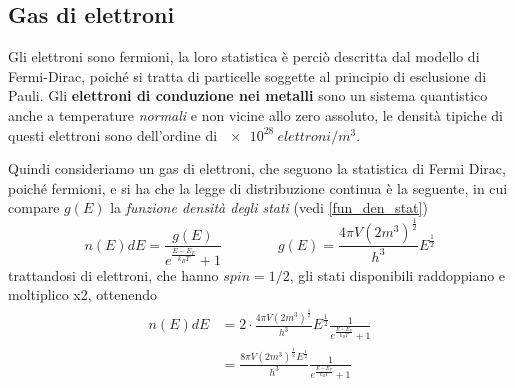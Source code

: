 \subsection{Gas di elettroni}

Gli elettroni sono fermioni, la loro statistica è perciò descritta dal modello di Fermi-Dirac, poiché si tratta di particelle soggette al principio di esclusione di Pauli.
Gli \textbf{elettroni di conduzione nei metalli} sono un sistema quantistico anche a temperature \textit{normali} e non vicine allo zero assoluto, le densità tipiche di questi elettroni sono dell'ordine di $\SI{e28}{elettroni/m^3}$.

Quindi consideriamo un gas di elettroni, che seguono la statistica di Fermi Dirac, poiché fermioni, e si ha che la legge di distribuzione continua è la seguente, in cui compare $g(E)$ la \textit{funzione densità degli stati} (vedi \ref{fun_den_stat})
\begin{equation}
n(E)dE = \frac{ g(E)}{e^{ \frac{ E - E_F}{k_B T } } + 1 }
\quad\quad\quad\quad
g(E) = \frac{4 \pi V (2m^3)^{ \frac{1}{2} }}{h^3} E^{ \frac{1}{2} }
\end{equation}
trattandosi di elettroni, che hanno $spin=1/2$, gli stati disponibili raddoppiano e moltiplico x2, ottenendo
\begin{equation}
\begin{split}
n(E)dE & = 2 \cdot \frac{4 \pi V (2m^3)^{\frac{1}{2}} }{h^3} E^{\frac{1}{2}} \frac{1}{e^{\frac{E - E_F}{k_B T}} + 1} \\
& = \frac{8 \pi V (2m^3)^{\frac{1}{2}} E^{\frac{1}{2}}}{h^3} \frac{1}{e^{\frac{E - E_F}{k_B T}} + 1}
\label{nede_elet}
\end{split}
\end{equation}


